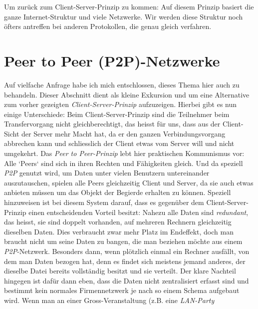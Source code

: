 \documentclass[b5paper,10pt,dvips,fleqn,titlepage,twoside]{book}
\begin{document}
Um zurück zum Client-Server-Prinzip zu kommen: Auf diesem Prinzip basiert die ganze Internet-Struktur und viele Netzwerke. Wir werden diese Struktur noch öfters antreffen bei anderen Protokollen, die genau gleich verfahren.

\section{Peer to Peer (P2P)-Netzwerke}
Auf vielfache Anfrage habe ich mich entschlossen, dieses Thema hier auch zu behandeln.
Dieser Abschnitt dient als kleine Exkursion und um eine Alternative zum vorher gezeigten \emph{Client-Server-Prinzip} aufzuzeigen. Hierbei gibt es nun einige Unterschiede:
Beim Client-Server-Prinzip sind die Teilnehmer beim Transfervorgang nicht gleichberechtigt, das heisst für uns, dass aus der Client-Sicht der Server mehr Macht hat, da er den ganzen Verbindungsvorgang abbrechen kann und schliesslich der Client etwas vom Server will und nicht umgekehrt.\newline
Das \emph{Peer to Peer-Prinzip} lebt hier praktischen Kommunismus vor: Alle `Peers` sind sich in ihren Rechten und Fähigkeiten gleich. Und da speziell \emph{P2P} genutzt wird, um Daten unter vielen Benutzern untereinander auszutauschen, spielen alle Peers gleichzeitig Client und Server, da sie auch etwas anbieten müssen um das Objekt der Begierde erhalten zu können.\newline
Speziell hinzuweisen ist bei diesem System darauf, dass es gegenüber dem Client-Server-Prinzip einen entscheidenden Vorteil besitzt: Nahezu alle Daten sind \emph{redundant}, das heisst, sie sind doppelt vorhanden, auf mehreren Rechnern gleichzeitig dieselben Daten. Dies verbraucht zwar mehr Platz im Endeffekt, doch man braucht nicht um seine Daten zu bangen, die man beziehen möchte aus einem \emph{P2P}-Netzwerk. Besonders dann, wenn plötzlich einmal ein Rechner ausfällt, von dem man Daten bezogen hat, denn es findet sich meistens jemand anderes, der dieselbe Datei bereits vollständig besitzt und sie verteilt. Der klare Nachteil hingegen ist dafür dann eben, dass die Daten nicht zentralisiert erfasst sind und bestimmt kein normales Firmennetzwerk je nach so einem Schema aufgebaut wird. Wenn man an einer Gross-Veranstaltung (z.B. eine \textit{LAN-Party}
\newpage
\end{document}
